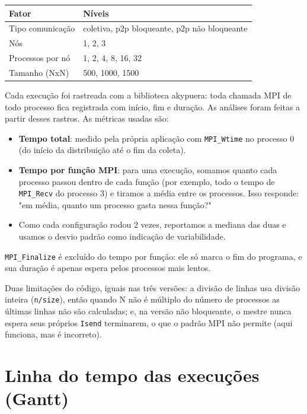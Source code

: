 \begin{longtable}[]{@{}ll@{}}
\toprule\noalign{}
Fator & Níveis \\
\midrule\noalign{}
\endhead
\bottomrule\noalign{}
\endlastfoot
Tipo comunicação & coletiva, p2p bloqueante, p2p não bloqueante \\
Nós & 1, 2, 3 \\
Processos por nó & 1, 2, 4, 8, 16, 32 \\
Tamanho (NxN) & 500, 1000, 1500 \\
\end{longtable}

Cada execução foi rastreada com a biblioteca akypuera: toda chamada MPI
de todo processo fica registrada com início, fim e duração. As análises
foram feitas a partir desses rastros. As métricas usadas são:

\begin{itemize}
\tightlist
\item
  \textbf{Tempo total}: medido pela própria aplicação com
  \texttt{MPI\_Wtime} no processo 0 (do início da distribuição até o fim
  da coleta).
\item
  \textbf{Tempo por função MPI}: para uma execução, somamos quanto cada
  processo passou dentro de cada função (por exemplo, todo o tempo de
  \texttt{MPI\_Recv} do processo 3) e tiramos a média entre os
  processos. Isso responde: "em média, quanto um processo gasta nessa
  função?"
\item
  Como cada configuração rodou 2 vezes, reportamos a mediana das duas e
  usamos o desvio padrão como indicação de variabilidade.
\end{itemize}

\texttt{MPI\_Finalize} é excluído do tempo por função: ele só marca o
fim do programa, e sua duração é apenas espera pelos processos mais
lentos.

Duas limitações do código, iguais nas três versões: a divisão de linhas
usa divisão inteira (\texttt{n/size}), então quando N não é múltiplo do
número de processos as últimas linhas não são calculadas; e, na versão
não bloqueante, o mestre nunca espera seus próprios \texttt{Isend}
terminarem, o que o padrão MPI não permite (aqui funciona, mas é
incorreto).

\section{Linha do tempo das execuções
(Gantt)}\label{linha-do-tempo-das-execuuxe7uxf5es-gantt}

